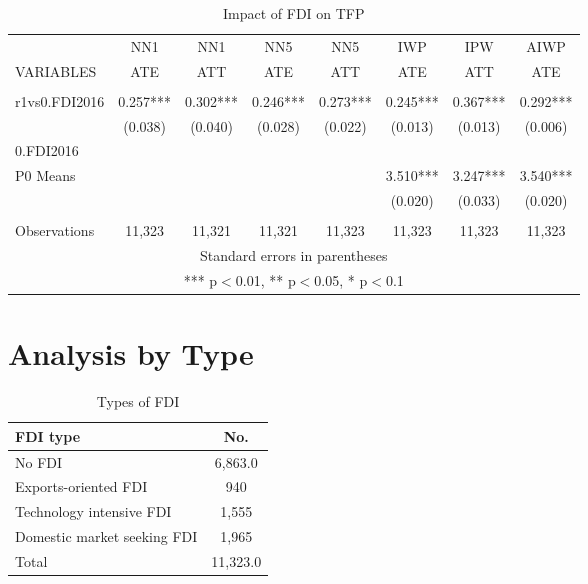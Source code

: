 \documentclass[a4paper,11pt]{scrartcl}
\begin{document}
\begin{table}[htbp]\centering
\caption{Impact of FDI on TFP}
\tiny
\begin{tabular}{lccccccc} \hline
 & NN1 & NN1 & NN5 & NN5 & IWP & IPW & AIWP \\
VARIABLES & ATE & ATT & ATE & ATT & ATE & ATT & ATE\\ \hline
 &  &  &  &  &  &  &  \\
r1vs0.FDI2016 & 0.257*** & 0.302*** & 0.246*** & 0.273*** & 0.245***   & 0.367*** & 0.292***  \\
 & (0.038) & (0.040) & (0.028) & (0.022) & (0.013)  & (0.013) & (0.006) \\
0.FDI2016 & & & & & &\\
P0  Means &  &  &  &    & 3.510***  & 3.247***& 3.540*** \\
 &  &  &  &  & (0.020)  & (0.033) & (0.020) \\
 &  &  &  &  &  &  &    \\
Observations & 11,323 & 11,321 & 11,321 & 11,323 & 11,323 & 11,323 & 11,323\\  \hline
\multicolumn{8}{c}{ Standard errors in parentheses} \\
\multicolumn{8}{c}{ *** p$<$0.01, ** p$<$0.05, * p$<$0.1} \\
\end{tabular}
\end{table}


\section{Analysis by Type}

\begin{table}[htbp]\centering
\caption{Types of FDI}
\begin{tabular}{lc} \hline
 FDI type&No. \\
\hline
No FDI&6,863.0 \\
Exports-oriented FDI&940 \\
Technology intensive FDI&1,555 \\
 Domestic market seeking FDI&1,965 \\
Total&11,323.0 \\
\end{tabular}
\end{table}
\end{document}

